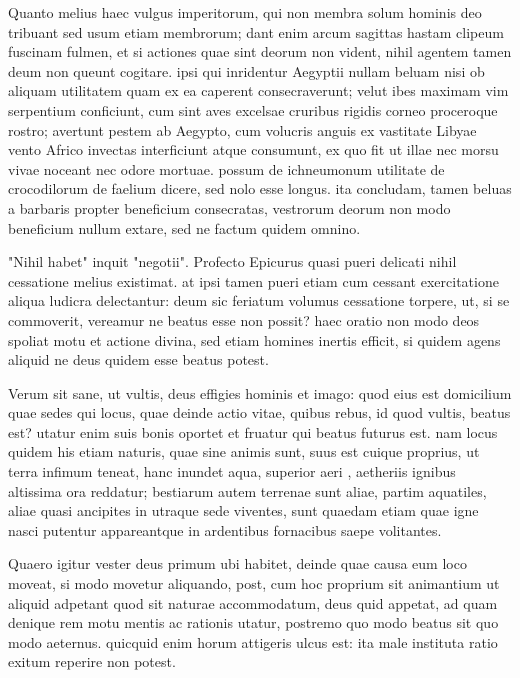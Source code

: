  Quanto melius haec vulgus imperitorum, qui non membra solum hominis deo tribuant sed usum etiam membrorum; dant enim arcum sagittas hastam clipeum fuscinam fulmen, et si actiones quae sint deorum non vident, nihil agentem tamen deum non queunt cogitare. ipsi qui inridentur Aegyptii nullam beluam nisi ob aliquam utilitatem quam ex ea caperent consecraverunt; velut ibes maximam vim serpentium conficiunt, cum sint aves excelsae cruribus rigidis corneo proceroque rostro; avertunt pestem ab Aegypto, cum volucris anguis ex vastitate Libyae vento Africo invectas interficiunt atque consumunt, ex quo fit ut illae nec morsu vivae noceant nec odore mortuae. possum de ichneumonum utilitate de crocodilorum de faelium dicere, sed nolo esse longus. ita concludam, tamen beluas a barbaris propter beneficium consecratas, vestrorum deorum non modo beneficium nullum extare, sed ne factum quidem omnino.

 "Nihil habet" inquit "negotii". Profecto Epicurus quasi pueri delicati nihil cessatione melius existimat. at ipsi tamen pueri etiam cum cessant exercitatione aliqua ludicra delectantur: deum sic feriatum volumus cessatione torpere, ut, si se commoverit, vereamur ne beatus esse non possit? haec oratio non modo deos spoliat motu et actione divina, sed etiam homines inertis efficit, si quidem agens aliquid ne deus quidem esse beatus potest.

 Verum sit sane, ut vultis, deus effigies hominis et imago: quod eius est domicilium quae sedes qui locus, quae deinde actio vitae, quibus rebus, id quod vultis, beatus est? utatur enim suis bonis oportet et fruatur qui beatus futurus est. nam locus quidem his etiam naturis, quae sine animis sunt, suus est cuique proprius, ut terra infimum teneat, hanc inundet aqua, superior aeri , aetheriis ignibus altissima ora reddatur; bestiarum autem terrenae sunt aliae, partim aquatiles, aliae quasi ancipites in utraque sede viventes, sunt quaedam etiam quae igne nasci putentur appareantque in ardentibus fornacibus saepe volitantes.

 Quaero igitur vester deus primum ubi habitet, deinde quae causa eum loco moveat, si modo movetur aliquando, post, cum hoc proprium sit animantium ut aliquid adpetant quod sit naturae accommodatum, deus quid appetat, ad quam denique rem motu mentis ac rationis utatur, postremo quo modo beatus sit quo modo aeternus. quicquid enim horum attigeris ulcus est: ita male instituta ratio exitum reperire non potest.

